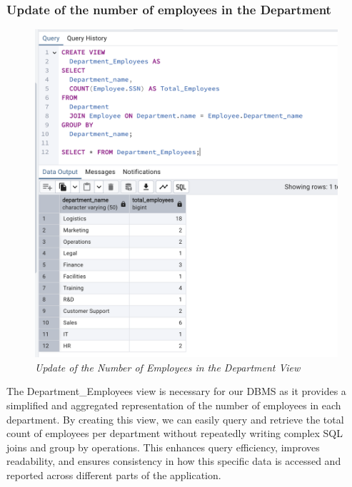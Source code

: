 \subsubsection{Update of the number of employees in the Department}



\begin{figure}[H]
  \centering
  \includegraphics[width=1\textwidth]{images/sql/views/update_number_of_employees_in_department.png}
  \caption{\textit{Update of the Number of Employees in the Department View}}
\end{figure}

The Department\_Employees view is necessary for our DBMS as it provides a simplified and aggregated representation of the number of employees in each department. By creating this view, we can easily query and retrieve the total count of employees per department without repeatedly writing complex SQL joins and group by operations. This enhances query efficiency, improves readability, and ensures consistency in how this specific data is accessed and reported across different parts of the application.

